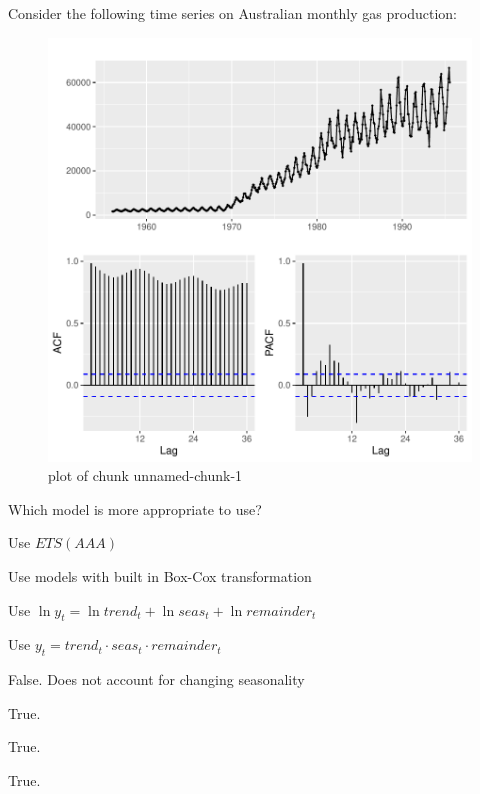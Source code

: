 
\begin{question}
Consider the following time series on Australian monthly gas production:

\begin{figure}[H]
\centering
\includegraphics{unnamed-chunk-1-1-4.pdf}
\caption{plot of chunk unnamed-chunk-1}
\end{figure}

Which model is more appropriate to use?
\begin{answerlist}
  \item Use \(ETS(AAA)\)
  \item Use models with built in Box-Cox transformation
  \item Use \(\ln y_t = \ln trend_t + \ln seas_t + \ln remainder_t\)
  \item Use \(y_t = trend_t \cdot seas_t \cdot remainder_t\)
\end{answerlist}
\end{question}

\begin{solution}
\begin{answerlist}
  \item False. Does not account for changing seasonality
  \item True.
  \item True.
  \item True.
\end{answerlist}
\end{solution}

